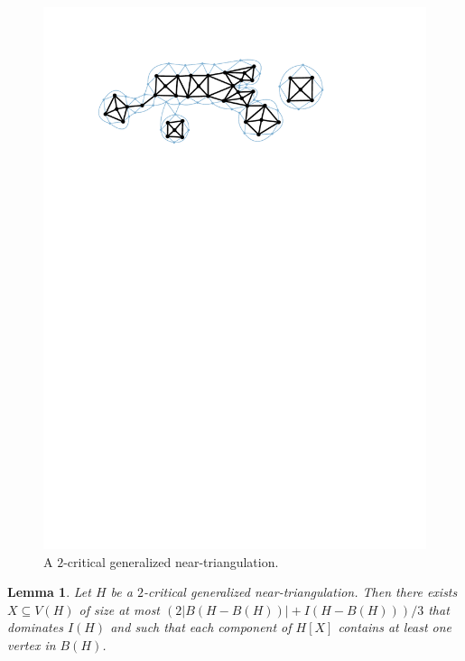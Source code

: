 \documentclass{article}
\newcommand{\pat}[1]{\textcolor{red}{PM: #1}}
\newcommand{\hussein}[1]{\textcolor{purple}{HH: #1}}
\newtheorem{lem}{Lemma}
\theoremstyle{definition}
\begin{document}
\begin{figure}
  \centering
  \includegraphics[page=1]{figs/two_critical}
  \caption{A $2$-critical generalized near-triangulation.}
  \label{two_critical_figure}
\end{figure}


\begin{lem}\label{two_critical_handler}
  Let $H$ be a $2$-critical generalized near-triangulation.  Then there exists $X\subseteq V(H)$ of size at most $(2|B(H-B(H))| + I(H-B(H)))/3$ that dominates $I(H)$ and such that each component of $H[X]$ contains at least one vertex in $B(H)$.
\end{lem}

\end{document}
